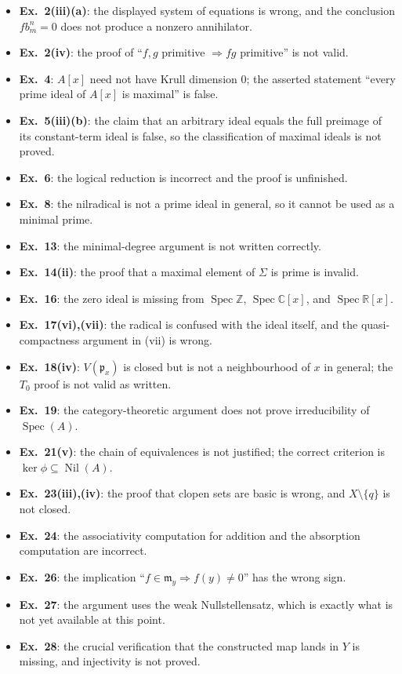 \documentclass[11pt]{article}
\DeclareMathOperator{\Spec}{Spec}
\DeclareMathOperator{\Nil}{Nil}
\newcommand{\fp}{\mathfrak p}
\newcommand{\fm}{\mathfrak m}
\begin{document}
\begin{itemize}[leftmargin=1.5em]
  \item \textbf{Ex.~2(iii)(a)}: the displayed system of equations is wrong, and
        the conclusion \(f b_m^n=0\) does not produce a nonzero annihilator.
  \item \textbf{Ex.~2(iv)}: the proof of ``\(f,g\) primitive
        \(\Rightarrow fg\) primitive'' is not valid.
  \item \textbf{Ex.~4}: \(A[x]\) need not have Krull dimension \(0\); the
        asserted statement ``every prime ideal of \(A[x]\) is maximal'' is
        false.
  \item \textbf{Ex.~5(iii)(b)}: the claim that an arbitrary ideal equals the
        full preimage of its constant-term ideal is false, so the
        classification of maximal ideals is not proved.
  \item \textbf{Ex.~6}: the logical reduction is incorrect and the proof is
        unfinished.
  \item \textbf{Ex.~8}: the nilradical is not a prime ideal in general, so it
        cannot be used as a minimal prime.
  \item \textbf{Ex.~13}: the minimal-degree argument is not written correctly.
  \item \textbf{Ex.~14(ii)}: the proof that a maximal element of \(\Sigma\) is
        prime is invalid.
  \item \textbf{Ex.~16}: the zero ideal is missing from
        \(\Spec\mathbb Z\), \(\Spec\mathbb C[x]\), and
        \(\Spec\mathbb R[x]\).
  \item \textbf{Ex.~17(vi),(vii)}: the radical is confused with the ideal
        itself, and the quasi-compactness argument in (vii) is wrong.
  \item \textbf{Ex.~18(iv)}: \(V(\fp_x)\) is closed but is not a neighbourhood
        of \(x\) in general; the \(T_0\) proof is not valid as written.
  \item \textbf{Ex.~19}: the category-theoretic argument does not prove
        irreducibility of \(\Spec(A)\).
  \item \textbf{Ex.~21(v)}: the chain of equivalences is not justified; the
        correct criterion is \(\ker\phi\subseteq\Nil(A)\).
  \item \textbf{Ex.~23(iii),(iv)}: the proof that clopen sets are basic is
        wrong, and \(X\setminus\{q\}\) is not closed.
  \item \textbf{Ex.~24}: the associativity computation for addition and the
        absorption computation are incorrect.
  \item \textbf{Ex.~26}: the implication ``\(f\in\fm_y\Rightarrow f(y)\neq0\)''
        has the wrong sign.
  \item \textbf{Ex.~27}: the argument uses the weak Nullstellensatz, which is
        exactly what is not yet available at this point.
  \item \textbf{Ex.~28}: the crucial verification that the constructed map
        lands in \(Y\) is missing, and injectivity is not proved.
\end{itemize}
\end{document}
